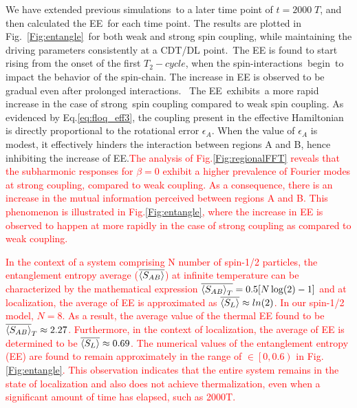 \documentclass[%
nofootinbib,
reprint,
superscriptaddress,
amsmath,amssymb,showkeys,
aps,
prb,
]{revtex4-2}
\newcommand{\red}[1]{\textcolor{red}{#1}}
\begin{document}
	We have extended previous simulations to a later time point of $t=2000\;T$, and then calculated the EE for each time point. The results are plotted in Fig.~\ref{Fig:entangle} for both weak and strong spin coupling, while maintaining the driving parameters consistently at a CDT/DL point. The EE is found to start rising from the onset of the first $T_2-cycle$, when the spin-interactions begin to impact the behavior of the spin-chain. The increase in EE is observed to be gradual even after prolonged interactions.  The EE exhibits a more rapid increase in the case of strong spin coupling compared to weak spin coupling. As evidenced by Eq.\eqref{eq:floq_eff3}, the coupling present in the effective Hamiltonian is directly proportional to the rotational error $\epsilon_A$. When the value of $\epsilon_A$ is modest, it effectively hinders the interaction between regions A and B, hence inhibiting the increase of EE.\red{The analysis of Fig.\ref{Fig:regionalFFT} reveals that the subharmonic responses for $\beta=0$ exhibit a higher prevalence of Fourier modes at strong coupling, compared to weak coupling. As a consequence, there is an increase in the mutual information perceived between regions A and B. This phenomenon is illustrated in Fig.\ref{Fig:entangle}, where the increase in EE is observed to happen at more rapidly in the case of strong coupling as compared to weak coupling.} 
	
	\red{	
	In the context of a system comprising N number of spin-1/2 particles, the entanglement entropy average ($\displaystyle \overline{\expval{S_{AB}}}$) at infinite temperature can be characterized by the mathematical expression $\displaystyle \overline{\expval{S_{AB}}_T} =  0.5[N \log(2)-1]$ \cite{Lu2021} and at localization, the average of EE is approximated as $\overline{\expval{S_L}}\approx ln(2)$\cite{sakurai_phys_nodate}. In our spin-1/2 model, $N=8$. As a result, the average value of the thermal EE found to be $\overline{\expval{S_{AB}}}_T \approx 2.27$. Furthermore, in the context of localization, the average of EE is determined to be $\overline{\expval{S_L}} \approx 0.69$. The numerical values of the entanglement entropy (EE) are found to remain approximately in the range of $\in\left[0,0.6\right)$ in Fig.\ref{Fig:entangle}. This observation indicates that the entire system remains in the state of localization and also does not achieve thermalization, even when a significant amount of time has elapsed, such as 2000T.}
	
\end{document}
